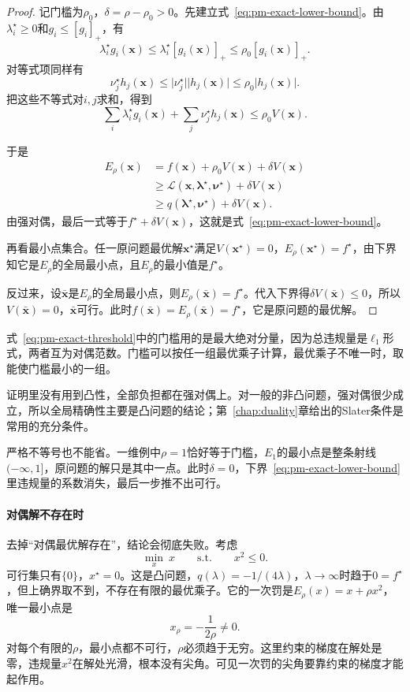 \begin{proof}
记门槛为$\rho_0$，$\delta=\rho-\rho_0>0$。先建立式~\eqref{eq:pm-exact-lower-bound}。由$\lambda_i^\star\geq0$和$g_i\leq[g_i]_+$，有
\[
 \lambda_i^\star g_i(\bm{x})\leq\lambda_i^\star[g_i(\bm{x})]_+\leq\rho_0[g_i(\bm{x})]_+ .
\]
对等式项同样有
\[
 \nu_j^\star h_j(\bm{x})\leq\lvert\nu_j^\star\rvert\lvert h_j(\bm{x})\rvert\leq\rho_0\lvert h_j(\bm{x})\rvert .
\]
把这些不等式对$i,j$求和，得到
\[
 \sum_i\lambda_i^\star g_i(\bm{x})+\sum_j\nu_j^\star h_j(\bm{x})\leq\rho_0V(\bm{x}).
\]

于是
\[
 \begin{aligned}
 E_\rho(\bm{x})&=f(\bm{x})+\rho_0V(\bm{x})+\delta V(\bm{x})\\
 &\geq\mathcal{L}(\bm{x},\bm{\lambda}^\star,\bm{\nu}^\star)+\delta V(\bm{x})\\
 &\geq q(\bm{\lambda}^\star,\bm{\nu}^\star)+\delta V(\bm{x}).
 \end{aligned}
\]
由强对偶，最后一式等于$f^\star+\delta V(\bm{x})$，这就是式~\eqref{eq:pm-exact-lower-bound}。

再看最小点集合。任一原问题最优解$\bm{x}^\star$满足$V(\bm{x}^\star)=0$，$E_\rho(\bm{x}^\star)=f^\star$，由下界知它是$E_\rho$的全局最小点，且$E_\rho$的最小值是$f^\star$。

反过来，设$\bar{\bm{x}}$是$E_\rho$的全局最小点，则$E_\rho(\bar{\bm{x}})=f^\star$。代入下界得$\delta V(\bar{\bm{x}})\leq0$，所以$V(\bar{\bm{x}})=0$，$\bar{\bm{x}}$可行。此时$f(\bar{\bm{x}})=E_\rho(\bar{\bm{x}})=f^\star$，它是原问题的最优解。
\end{proof}

式~\eqref{eq:pm-exact-threshold}中的门槛用的是最大绝对分量，因为总违规量是$\ell_1$形式，两者互为对偶范数。门槛可以按任一组最优乘子计算，最优乘子不唯一时，取能使门槛最小的一组。

证明里没有用到凸性，全部负担都在强对偶上。对一般的非凸问题，强对偶很少成立，所以全局精确性主要是凸问题的结论；第~\ref{chap:duality}章给出的Slater条件是常用的充分条件。

严格不等号也不能省。一维例中$\rho=1$恰好等于门槛，$E_1$的最小点是整条射线$(-\infty,1]$，原问题的解只是其中一点。此时$\delta=0$，下界~\eqref{eq:pm-exact-lower-bound}里违规量的系数消失，最后一步推不出可行。

\paragraph{对偶解不存在时}
去掉“对偶最优解存在”，结论会彻底失败。考虑
\[
 \min_x\ x\qquad\text{s.t.}\qquad x^2\leq0 .
\]
可行集只有$\{0\}$，$x^\star=0$。这是凸问题，$q(\lambda)=-1/(4\lambda)$，$\lambda\to\infty$时趋于$0=f^\star$，但上确界取不到，不存在有限的最优乘子。它的一次罚是$E_\rho(x)=x+\rho x^2$，唯一最小点是
\[
 x_\rho=-\frac{1}{2\rho}\neq0 .
\]
对每个有限的$\rho$，最小点都不可行，$\rho$必须趋于无穷。这里约束的梯度在解处是零，违规量$x^2$在解处光滑，根本没有尖角。可见一次罚的尖角要靠约束的梯度才能起作用。

